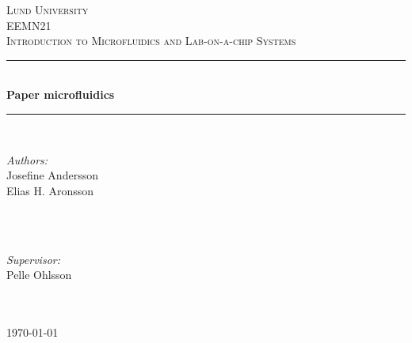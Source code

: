 \begin{titlepage}

\newcommand{\HRule}{\rule{\linewidth}{0.5mm}}
\center 
\textsc{\LARGE Lund University}\\[1.5cm]
\textsc{\Large EEMN21}\\[0.5cm]
\textsc{\large Introduction to Microfluidics and Lab-on-a-chip Systems}\\[0.5cm]
\HRule \\[0.4cm]
{ \huge \bfseries Paper microfluidics}\\[0.4cm]
\HRule \\[2cm]

\begin{minipage}{0.4\textwidth}
\begin{flushleft}
\emph{Authors:}\\
Josefine Andersson \\
Elias H. Aronsson\\



\emph{}\\
\end{flushleft}
\end{minipage}
~
\begin{minipage}{0.4\textwidth}
\begin{flushright}
\emph{Supervisor:} \\
Pelle Ohlsson\\


\emph{}\\
\end{flushright}
\end{minipage}\\[2cm]

{\today}


\vfill

\end{titlepage}

